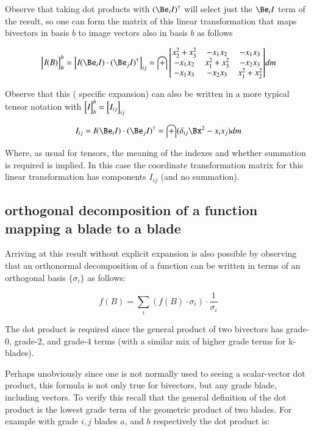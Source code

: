 \documentclass{article}      %
\newcommand{\matrixoftx}[3]{
{
\begin{bmatrix}
{#1}
\end{bmatrix}
}_{#2}^{#3}
}
\newcommand{\coordvec}[2]{
{
\begin{bmatrix}
{#1}
\end{bmatrix}
}_{#2}
}
\begin{document}
Observe that taking dot products with $(\Be_i I)^\dagger$ will select just the $\Be_i I$ term of the result, so one can
form the matrix of this linear transformation that maps bivectors in basis $b$ to image vectors also in basis $b$ as follows

\[
\matrixoftx{\emph{I}(B)}{b}{b}
=
\coordvec{\emph{I}(\Be_i I) \cdot (\Be_j I)^\dagger}{ij}
=
\int {\begin{bmatrix}
x_2^2 + x_3^2  & - x_1 x_2  & - x_1 x_3 \\
-x_1 x_2  & x_1^2 + x_3^2  & - x_2 x_3  \\
-x_1 x_3  & -x_2 x_3  & x_1^2 + x_2^2  \\
\end{bmatrix}} dm
\]

Observe that this ( specific expansion) can also be written in a more
typical tensor notation with $\matrixoftx{\emph{I}}{b}{b} = \coordvec{I_{ij}}{ij}$

\[
I_{ij} 
= \emph{I}(\Be_i I) \cdot (\Be_j I)^\dagger 
= \int (\delta_{ij} \Bx^2 - x_i x_j) dm
\]

Where, as usual for tensors, the meaning of the indexes and whether summation is required is implied.  In this case
the coordinate transformation matrix for this linear transformation has components $I_{ij}$ (and no summation).

\subsection{ orthogonal decomposition of a function mapping a blade to a blade }

Arriving at this result without explicit expansion is also possible by observing that an orthonormal decomposition of a 
function can be written in terms of an orthogonal basis $\{\sigma_i\}$ as follows:

\begin{equation}
f(B) = \sum_i (f(B) \cdot \sigma_i) \cdot \frac{1}{\sigma_i}
\end{equation}\label{eqn:bladeOrthogDecomp}

The dot product is required since the general product of two bivectors has grade-0, grade-2, and grade-4 terms (with a similar mix of higher grade terms for k-blades).

Perhaps unobviously since one is not normally used to seeing a scalar-vector dot product, this formula is not only true for bivectors, but any grade blade, including
vectors.  To verify this recall that the 
general definition of the dot product is the lowest grade term of the geometric product of two blades.  For example with grade $i,j$ blades $a$, and $b$ respectively
the dot product is:
\end{document}
